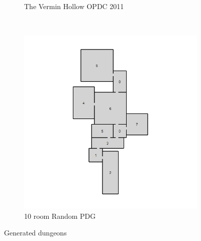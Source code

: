 \documentclass{UoYCSproject}
\begin{document}
\begin{figure}[htb]
\begin{subfigure}[b]{0.35\textwidth}
    \caption{The Vermin Hollow OPDC 2011}
  \end{subfigure}
  ~
  \begin{subfigure}[b]{0.35\textwidth}
    \centering
    \includegraphics[width=\textwidth]{figures/generated/RAND_10_6.jpg}
    \caption{10 room Random PDG}
  \end{subfigure}
  \caption{Generated dungeons}
  \label{fig:gen_dungeons}
\end{figure}

\printbibliography
\end{document}
